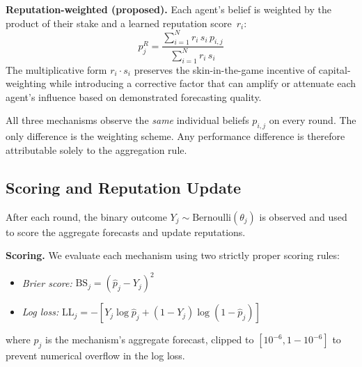 \documentclass[conference]{IEEEtran}
\begin{document}
\textbf{Reputation-weighted (proposed).} Each agent's belief is weighted by the product of their stake and a learned reputation score~$r_i$:
\begin{equation}
    p_j^R = \frac{\sum_{i=1}^{N} r_i \, s_i \, p_{i,j}}{\sum_{i=1}^{N} r_i \, s_i}
\end{equation}
The multiplicative form $r_i \cdot s_i$ preserves the skin-in-the-game incentive of capital-weighting while introducing a corrective factor that can amplify or attenuate each agent's influence based on demonstrated forecasting quality.

All three mechanisms observe the \emph{same} individual beliefs $p_{i,j}$ on every round. The only difference is the weighting scheme. Any performance difference is therefore attributable solely to the aggregation rule.

\subsection{Scoring and Reputation Update}
\label{sec:model-reputation}

After each round, the binary outcome $Y_j \sim \text{Bernoulli}(\theta_j)$ is observed and used to score the aggregate forecasts and update reputations.

\textbf{Scoring.} We evaluate each mechanism using two strictly proper scoring rules:
\begin{itemize}
    \item \emph{Brier score:} $\text{BS}_j = (\hat{p}_j - Y_j)^2$
    \item \emph{Log loss:} $\text{LL}_j = -[Y_j \log \hat{p}_j + (1 - Y_j) \log(1 - \hat{p}_j)]$
\end{itemize}
where $\hat{p}_j$ is the mechanism's aggregate forecast, clipped to $[10^{-6}, 1 - 10^{-6}]$ to prevent numerical overflow in the log loss.
\end{document}
